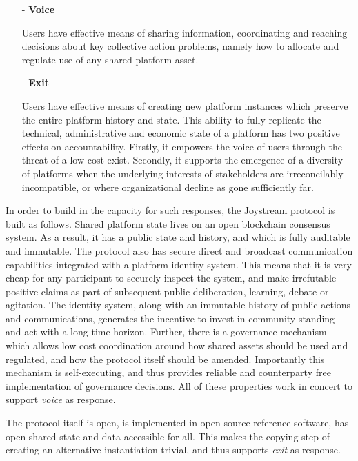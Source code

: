 \documentclass{article}
\begin{document}
\begin{itemize}

    \item[-] \textbf{Voice}

    Users have effective means of sharing information, coordinating and reaching decisions about key collective action problems, namely how to allocate and regulate use of any shared platform asset.

    \item[-] \textbf{Exit}

    Users have effective means of creating new platform instances which preserve the entire platform history and state. This ability to fully replicate the technical, administrative and economic state of a platform has two positive effects on accountability. Firstly, it empowers the voice of users through the threat of a low cost exist. Secondly, it supports the emergence of a diversity of platforms when the underlying interests of stakeholders are irreconcilably incompatible, or where organizational decline as gone sufficiently far.

\end{itemize}

In order to build in the capacity for such responses, the Joystream protocol is built as follows. Shared platform state lives on an open blockchain consensus system. As a result, it has a public state and history, and which is fully auditable and immutable. The protocol also has secure direct and broadcast communication capabilities integrated with a platform identity system. This means that it is very cheap for any participant to securely inspect the system, and make irrefutable positive claims as part of subsequent public deliberation, learning, debate or agitation. The identity system, along with an immutable history of public actions and communications, generates the incentive to invest in community standing and act with a long time horizon. Further, there is a governance mechanism which allows low cost coordination around how shared assets should be used and regulated, and how the protocol itself should be amended. Importantly this mechanism is self-executing, and thus provides reliable and counterparty free implementation of governance decisions. All of these properties work in concert to support \textit{voice} as response.

The protocol itself is open, is implemented in open source reference software, has open shared state and data accessible for all. This makes the copying step of creating an alternative instantiation trivial, and thus supports \textit{exit} as response.
\end{document}
